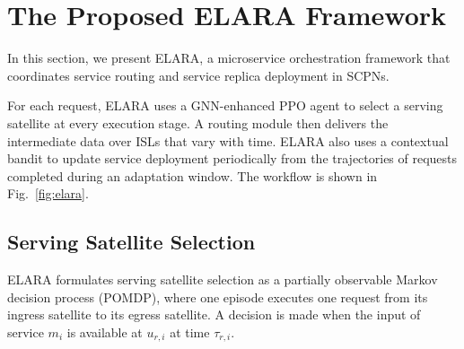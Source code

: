 \documentclass[10pt, conference, letterpaper]{IEEEtran}
\begin{document}
\section{The Proposed ELARA Framework}
\label{sec:algo}
In this section, we present ELARA, a microservice orchestration framework that coordinates service routing and  service replica deployment in SCPNs.

For each request, ELARA uses a GNN-enhanced PPO agent to select a serving satellite at every execution stage. A routing module then delivers the intermediate data over ISLs that vary with time. ELARA also uses a contextual bandit to update service deployment periodically from the trajectories of requests completed during an adaptation window. The workflow is shown in Fig.~\ref{fig:elara}.




\subsection{Serving Satellite Selection}

ELARA formulates serving satellite selection as a partially observable Markov decision process (POMDP), where one episode executes one request from its ingress satellite to its egress satellite. A decision is made when the input of service $m_i$ is available at $u_{r,i}$ at time $\tau_{r,i}$.
\end{document}
